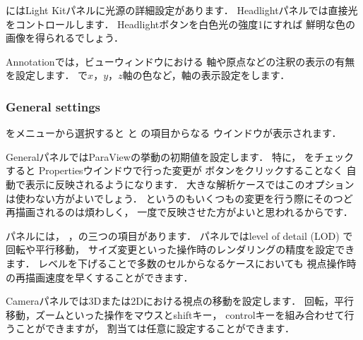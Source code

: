 にはLight Kitパネルに光源の詳細設定があります．
Headlightパネルでは直接光をコントロールします．
Headlightボタンを白色光の強度1にすれば
鮮明な色の画像を得られるでしょう．

Annotationでは，ビューウィンドウにおける
軸や原点などの注釈の表示の有無を設定します．
%
%
で$x$，$y$，$z$軸の色など，軸の表示設定をします．

\subsubsection{General settings}
\label{sssec:6.1.5.2}
%
%
をメニューから選択すると
と
%
%
の項目からなる
%
%
ウインドウが表示されます．

GeneralパネルではParaViewの挙動の初期値を設定します．
特に，
%
%
をチェックすると
Propertiesウインドウで行った変更が
%
%
ボタンをクリックすることなく
自動で表示に反映されるようになります．
大きな解析ケースではこのオプションは使わない方がよいでしょう．
というのもいくつもの変更を行う際にそのつど再描画されるのは煩わしく，
一度で反映させた方がよいと思われるからです．

%
%
パネルには，
，の三つの項目があります．
パネルではlevel of detail (LOD) で回転や平行移動，
サイズ変更といった操作時のレンダリングの精度を設定できます．
レベルを下げることで多数のセルからなるケースにおいても
視点操作時の再描画速度を早くすることができます．

Cameraパネルでは3Dまたは2Dにおける視点の移動を設定します．
回転，平行移動，ズームといった操作をマウスとshiftキー，
controlキーを組み合わせて行うことができますが，
割当ては任意に設定することができます．


